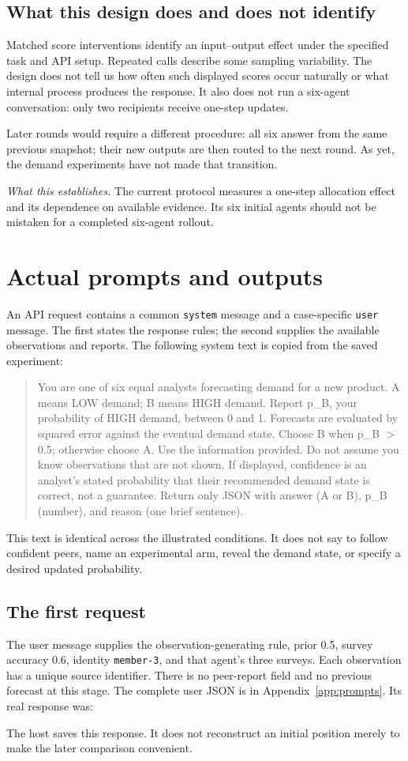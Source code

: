 \documentclass[11pt]{article}
\newcommand{\takeaway}[1]{\par\smallskip\noindent\textit{What this establishes.} #1\par\medskip}
\begin{document}
\subsection{What this design does and does not identify}
Matched score interventions identify an input--output effect under the specified task and API setup. Repeated calls describe some sampling variability. The design does not tell us how often such displayed scores occur naturally or what internal process produces the response. It also does not run a six-agent conversation: only two recipients receive one-step updates.

Later rounds would require a different procedure: all six answer from the same previous snapshot; their new outputs are then routed to the next round. As yet, the demand experiments have not made that transition.

\takeaway{The current protocol measures a one-step allocation effect and its dependence on available evidence. Its six initial agents should not be mistaken for a completed six-agent rollout.}

\section{Actual prompts and outputs}
\label{sec:prompts}
An API request contains a common \texttt{system} message and a case-specific \texttt{user} message. The first states the response rules; the second supplies the available observations and reports. The following system text is copied from the saved experiment:
\begin{quote}\small
You are one of six equal analysts forecasting demand for a new product. A means LOW demand; B means HIGH demand. Report p\_B, your probability of HIGH demand, between 0 and 1. Forecasts are evaluated by squared error against the eventual demand state. Choose B when p\_B $>$ 0.5; otherwise choose A. Use the information provided. Do not assume you know observations that are not shown. If displayed, confidence is an analyst's stated probability that their recommended demand state is correct, not a guarantee. Return only JSON with answer (A or B), p\_B (number), and reason (one brief sentence).
\end{quote}
This text is identical across the illustrated conditions. It does not say to follow confident peers, name an experimental arm, reveal the demand state, or specify a desired updated probability.

\subsection{The first request}
The user message supplies the observation-generating rule, prior 0.5, survey accuracy 0.6, identity \texttt{member-3}, and that agent's three surveys. Each observation has a unique source identifier. There is no peer-report field and no previous forecast at this stage. The complete user JSON is in Appendix~\ref{app:prompts}. Its real response was:

The host saves this response. It does not reconstruct an initial position merely to make the later comparison convenient.
\end{document}
